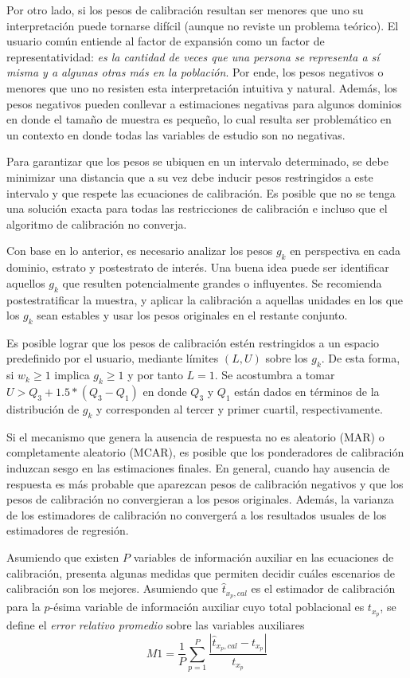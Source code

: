 \documentclass[
  12pt,
  spanish,
]{book}
\begin{document}
Por otro lado, si los pesos de calibración resultan ser menores que uno su interpretación puede tornarse difícil (aunque no reviste un problema teórico). El usuario común entiende al factor de expansión como un factor de representatividad: \emph{es la cantidad de veces que una persona se representa a sí misma y a algunas otras más en la población}. Por ende, los pesos negativos o menores que uno no resisten esta interpretación intuitiva y natural. Además, los pesos negativos pueden conllevar a estimaciones negativas para algunos dominios en donde el tamaño de muestra es pequeño, lo cual resulta ser problemático en un contexto en donde todas las variables de estudio son no negativas.

Para garantizar que los pesos se ubiquen en un intervalo determinado, se debe minimizar una distancia que a su vez debe inducir pesos restringidos a este intervalo y que respete las ecuaciones de calibración. Es posible que no se tenga una solución exacta para todas las restricciones de calibración e incluso que el algoritmo de calibración no converja.

Con base en lo anterior, es necesario analizar los pesos \(g_k\) en perspectiva en cada dominio, estrato y postestrato de interés. Una buena idea puede ser identificar aquellos \(g_k\) que resulten potencialmente grandes o influyentes. Se recomienda postestratificar la muestra, y aplicar la calibración a aquellas unidades en los que los \(g_k\) sean estables y usar los pesos originales en el restante conjunto.

Es posible lograr que los pesos de calibración estén restringidos a un espacio predefinido por el usuario, mediante límites \((L, U)\) sobre los \(g_k\). De esta forma, si \(w_k \geq 1\) implica \(g_k \geq 1\) y por tanto \(L=1\). Se acostumbra a tomar \(U > Q_3 + 1.5 * (Q_3 - Q_1)\) en donde \(Q_3\) y \(Q_1\) están dados en términos de la distribución de \(g_k\) y corresponden al tercer y primer cuartil, respectivamente.

Si el mecanismo que genera la ausencia de respuesta no es aleatorio (MAR) o completamente aleatorio (MCAR), es posible que los ponderadores de calibración induzcan sesgo en las estimaciones finales. En general, cuando hay ausencia de respuesta es más probable que aparezcan pesos de calibración negativos y que los pesos de calibración no convergieran a los pesos originales. Además, la varianza de los estimadores de calibración no convergerá a los resultados usuales de los estimadores de regresión.

Asumiendo que existen \(P\) variables de información auxiliar en las ecuaciones de calibración, \citet{Silva_2004} presenta algunas medidas que permiten decidir cuáles escenarios de calibración son los mejores. Asumiendo que \(\hat{t}_{x_p, cal}\) es el estimador de calibración para la \(p\)-ésima variable de información auxiliar cuyo total poblacional es \(t_{x_p}\), se define el \emph{error relativo promedio} sobre las variables auxiliares
\[
M1= \frac{1}{P} \sum_{p=1}^P \frac{|\hat{t}_{x_p, cal} - t_{x_p}|}{t_{x_p}}
\]
\end{document}
